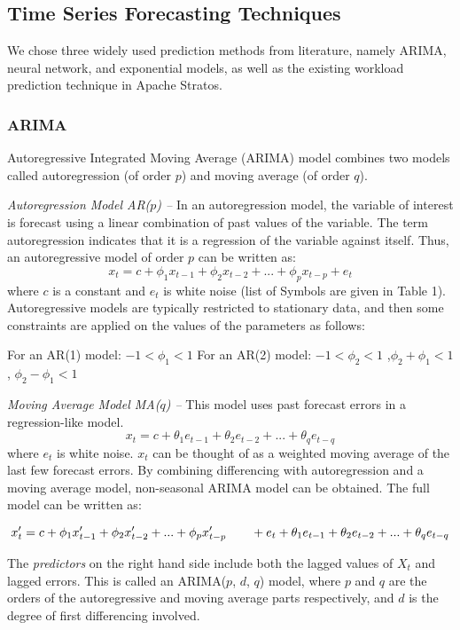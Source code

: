 \subsection{Time Series Forecasting Techniques}
We chose three widely used prediction methods from literature, namely ARIMA, neural network, and exponential models, as well as the existing workload prediction technique in Apache Stratos.

\subsubsection{ARIMA}
Autoregressive Integrated Moving Average (ARIMA) model combines two models called autoregression (of order $p$) and moving average (of order $q$).

\noindent
\textit{Autoregression Model AR($p$) --}
In an autoregression model, the variable of interest is forecast using a linear combination of past values of the variable. The term autoregression indicates that it is a regression of the variable against itself. Thus, an autoregressive model of order $p$ can be written as:
	$$x_t = c + \phi_1x_{ t-1} + \phi_2x_{t-2} +...+ \phi_px_{t-p} + e_{t}$$
where $c$ is a constant and $e_t$ is white noise (list of Symbols are given in Table 1). Autoregressive models are typically restricted to stationary data, and then some constraints are applied on the values of the parameters \cite{Forecasting_OTexts} as follows:

    For an AR(1) model: $-1 < \phi_{1} < 1$
    For an AR(2) model: $-1 < \phi_{2} < 1$ ,$\phi_{2}+ \phi_{1} < 1$ , $\phi_{2} - \phi_{1} < 1$

\noindent
\textit{Moving Average Model MA($q$) --}
This model uses past forecast errors in a regression-like model.
	$$x_t = c + \theta_1e_{ t-1} + \theta_2e_{t-2} +...+ \theta_qe_{t-q}$$
where $e_t$ is white noise. $x_t$ can be thought of as a weighted moving average of the last few forecast errors. 
By combining differencing with autoregression and a moving average model, non-seasonal ARIMA model can be obtained. The full model can be written as:

	$${x}'_t = c+ \phi_1{x}'_{ t-1} + \phi_2{x}'_{t-2} +...+ \phi_p{x}'_{t-p}\\ \qquad + e_{t} + \theta_1e_{ t-1} + \theta_2e_{t-2} +...+ \theta_qe_{t-q}$$

The \textit{predictors} on the right hand side include both the lagged values of $X_t$ and lagged errors. This is called an ARIMA($p$, $d$, $q$) model, where $p$ and $q$ are the orders of the autoregressive and moving average parts respectively, and $d$ is the degree of first differencing involved.

